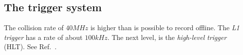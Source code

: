 \subsection{The trigger system}\label{sec:trigger}
The collision rate of $40\unit{MHz}$ is higher than is possible to record offline.
The \emph{L1 trigger} has a rate of about $100\unit{kHz}$.
The next level, is the \emph{high-level trigger} (HLT).
See Ref.~\cite{CMS_trigger}.


